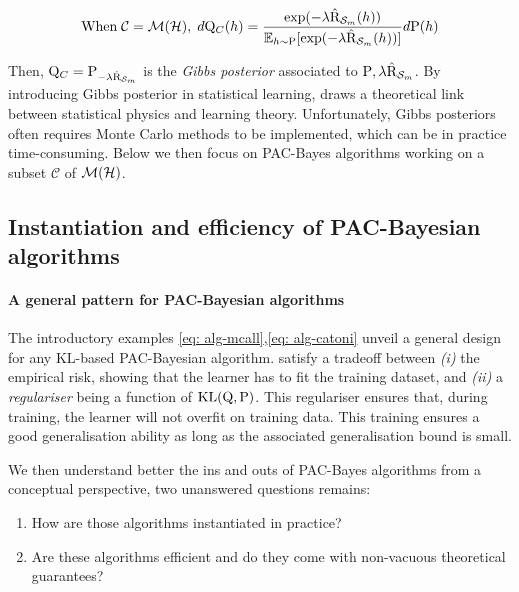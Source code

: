 \begin{align}
  \label{eq: catoni-gibbs}
  \text{When}\; \mathcal{C}= \mathcal{M}(\mathcal{H}),\; d\mathrm{Q}_{C}(h) = \frac{\exp(-\lambda \hat{\text{R}}_{\mathcal{S}_m}(h))}{\mathbb{E}_{h\sim\mathrm{P}}[\exp(-\lambda \hat{\text{R}}_{\mathcal{S}_m}(h))]} d\mathrm{P}(h)
\end{align}

Then, $\mathrm{Q}_{C} = \mathrm{P}_{-\lambda \hat{\text{R}}_{\mathcal{S}_m}}$ is the \emph{Gibbs posterior} associated to $\mathrm{P},\lambda\hat{\text{R}}_{\mathcal{S}_m}$. By introducing Gibbs posterior in statistical learning, \citet{catoni2007pac} draws a theoretical link between statistical physics and learning theory. Unfortunately, Gibbs posteriors often requires Monte Carlo methods to be implemented, which can be in practice time-consuming. Below we then focus on PAC-Bayes algorithms working on a subset $\mathcal{C}$ of $\mathcal{M}(\mathcal{H})$. 

\subsection*{Instantiation and efficiency of PAC-Bayesian algorithms}

\paragraph{A general pattern for PAC-Bayesian algorithms}

The introductory examples \eqref{eq: alg-mcall},\eqref{eq: alg-catoni} unveil a general design for any KL-based PAC-Bayesian algorithm. satisfy a tradeoff between \textit{(i)} the empirical risk, showing that the learner has to fit the training dataset, and \textit{(ii)} a \emph{regulariser} being a function of $\mathrm{KL}(\mathrm{Q},\mathrm{P})$. This regulariser ensures that, during training, the learner will not overfit on training data. This training ensures a good generalisation ability as long as the associated generalisation bound is small. 

We then understand better the ins and outs of PAC-Bayes algorithms from a conceptual perspective, two unanswered questions remains: 

\begin{enumerate}
  \item How are those algorithms instantiated in practice?
  \item Are these algorithms efficient and do they come with non-vacuous theoretical guarantees? 
\end{enumerate}

